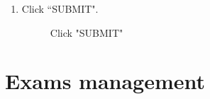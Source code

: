 \documentclass[ManualeUtente]{subfiles}
\begin{document}
\begin{enumerate}
		\item Click \textquotedblleft SUBMIT".
		\begin{figure}[H]
			\centering
			\caption{Click "SUBMIT"}
			\label{fig:Click "SUBMIT"}
		\end{figure}
	\end{enumerate}
	\newpage
	\section{Exams management}
\end{document}
